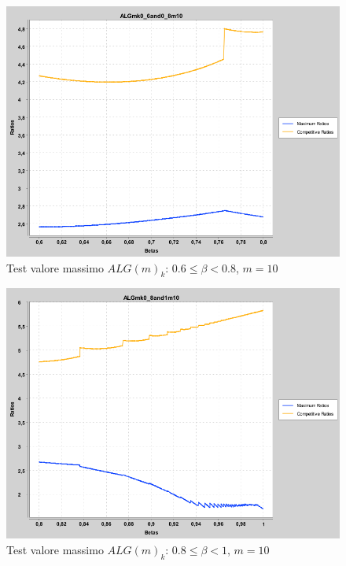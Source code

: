 \documentclass[12pt]{article}
\begin{document}
\begin{figure}[H]
\caption{Test valore massimo $ALG(m)_{k}$: $0.6 \leq \beta < 0.8$, $m = 10$}
\centering
\includegraphics[scale=0.4]{max/ALGmk0_6and0_8m10.png}
\end{figure}
\begin{figure}[H]
\caption{Test valore massimo $ALG(m)_{k}$: $0.8 \leq \beta < 1$, $m = 10$}
\centering
\includegraphics[scale=0.4]{max/ALGmk0_8and1m10.png}
\end{figure}
\end{document}
